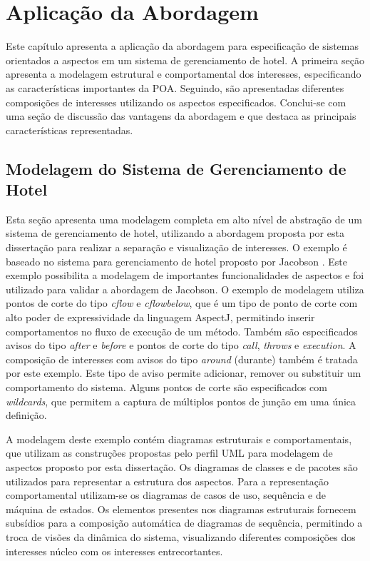 \chapter{Aplicação da Abordagem}\label{case_study}

Este capítulo apresenta a aplicação da abordagem para especificação de sistemas orientados a aspectos em um sistema de gerenciamento de hotel.
A primeira seção apresenta a modelagem estrutural e comportamental dos interesses, especificando as características importantes da POA. Seguindo, são
apresentadas diferentes composições de interesses utilizando os aspectos especificados. Conclui-se com uma seção de discussão das vantagens da
abordagem e que destaca as principais características representadas.

\section{Modelagem do Sistema de Gerenciamento de Hotel}

Esta seção apresenta uma modelagem completa em alto nível de abstração de um sistema de gerenciamento de hotel, utilizando a abordagem proposta
por esta dissertação para realizar a separação e visualização de interesses. O exemplo é baseado no sistema para gerenciamento de hotel proposto por
Jacobson \cite{Jacobson:2004:ASD:1062430}. Este exemplo possibilita a modelagem de importantes funcionalidades de aspectos e foi utilizado para validar 
a abordagem de Jacobson. O exemplo de modelagem utiliza pontos de corte do tipo \textit{cflow} e \textit{cflowbelow}, que é um tipo de ponto de corte
com alto poder de expressividade da linguagem AspectJ, permitindo inserir comportamentos no fluxo de execução de um método. Também são especificados
avisos do tipo \textit{after} e \textit{before} e pontos de corte do tipo \textit{call}, \textit{throws} e \textit{execution}. A composição de
interesses com avisos do tipo \textit{around} (durante) também é tratada por este exemplo. Este tipo de aviso permite adicionar, remover ou
substituir um comportamento do sistema. Alguns pontos de corte são especificados com \textit{wildcards}, que permitem a captura de múltiplos pontos de
junção em uma única definição.

A modelagem deste exemplo contém diagramas estruturais e comportamentais, que utilizam as construções propostas pelo perfil UML para modelagem
de aspectos proposto por esta dissertação. Os diagramas de classes e de pacotes são utilizados para representar a estrutura dos aspectos. Para a
representação comportamental utilizam-se os diagramas de casos de uso, sequência e de máquina de estados. Os elementos presentes nos diagramas estruturais 
fornecem subsídios para a composição automática de diagramas de sequência, permitindo a troca de visões da dinâmica do sistema, visualizando
diferentes composições dos interesses núcleo com os interesses entrecortantes.

